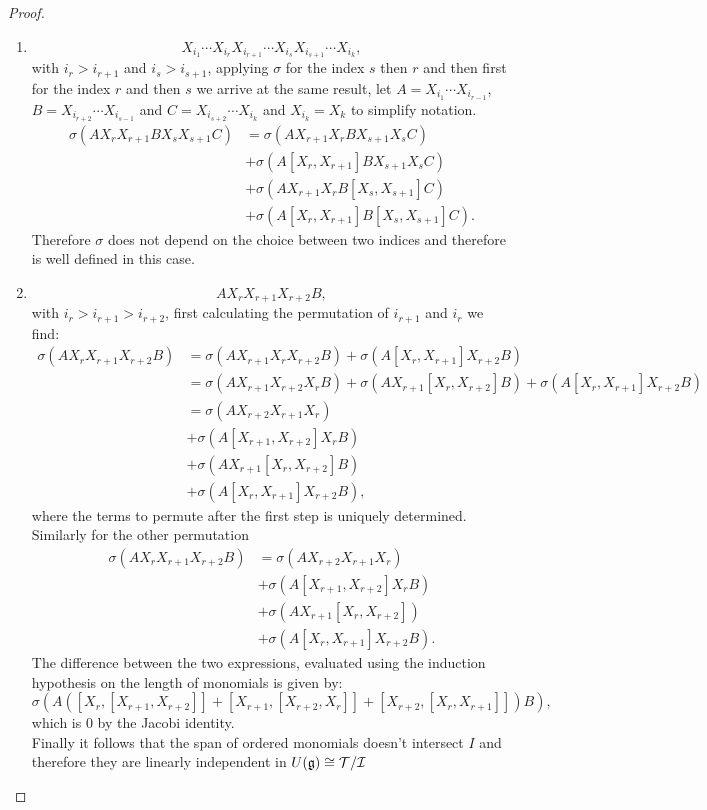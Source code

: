 \begin{proof}
\begin{enumerate}
		\item $$ 
		X_{i_1} \cdots X_{i_r}X_{i_{r+1}}\cdots X_{i_s}X_{i_{s+1}}\cdots X_{i_k},
		$$
		with $i_r>i_{r+1}$ and $i_s>i_{s+1}$, applying $\sigma$ for the index $s$ then $r$ and then first for the index $r$ and then $s$ we arrive at the same result, let $A=X_{i_1}\cdots X_{i_{r-1}}$, $B=X_{i_{r+2}}\cdots X_{i_{s-1}}$ and $C=X_{i_{s+2}}\cdots X_{i_k}$ and $X_{i_k}=X_k$ to simplify notation.
		\begin{align*}
		\sigma(AX_rX_{r+1}BX_sX_{s+1}C) &= \sigma(AX_{r+1}X_rBX_{s+1}X_sC) \\
		&+\sigma(A[X_r,X_{r+1}]BX_{s+1}X_sC)\\
		&+\sigma(AX_{r+1}X_rB[X_s,X_{s+1}]C)\\
		&+\sigma(A[X_r,X_{r+1}]B[X_s,X_{s+1}]C).
		\end{align*}
		Therefore $\sigma$ does not depend on the choice between two indices and therefore is well defined in this case.
		\item $$AX_rX_{r+1}X_{r+2}B,$$
		with $i_r > i_{r+1}>i_{r+2}$, first calculating the permutation of $i_{r+1}$ and $i_r$ we find:
		\begin{align*}
		\sigma (AX_rX_{r+1}X_{r+2}B) &= \sigma(AX_{r+1}X_rX_{r+2}B) + \sigma(A[X_r,X_{r+1}]X_{r+2}B)\\~
		&= \sigma(AX_{r+1}X_{r+2}X_rB) + \sigma(AX_{r+1}[X_r,X_{r+2}]B)+\sigma(A[X_{r},X_{r+1}]X_{r+2}B)\\
		&= \sigma(AX_{r+2}X_{r+1}X_r) \\
		&+ \sigma(A[X_{r+1},X_{r+2}]X_rB)\\
		&+ \sigma (AX_{r+1}[X_r,X_{r+2}]B)\\
		&+ \sigma(A[X_r,X_{r+1}]X_{r+2}B),
		\end{align*}
		where the terms to permute after the first step is uniquely determined. Similarly for the other permutation
		\begin{align*}
		\sigma(AX_rX_{r+1}X_{r+2}B) &= \sigma(AX_{r+2}X_{r+1}X_r) \\
		&+ \sigma(A[X_{r+1},X_{r+2}]X_rB)\\
		&+ \sigma(AX_{r+1}[X_r,X_{r+2}])\\
		&+\sigma(A[X_r,X_{r+1}]X_{r+2}B).
		\end{align*}
		The difference between the two expressions, evaluated using the induction hypothesis on the length of monomials is given by:
		$$\sigma(A([X_r,[X_{r+1},X_{r+2}]]+[X_{r+1},[X_{r+2},X_r]]+[X_{r+2},[X_r,X_{r+1}]])B),$$
		which is $0$ by the Jacobi identity.\\
		Finally it follows that the span of ordered monomials doesn't intersect $I$ and therefore they are linearly independent in $U(\mathfrak{g})\cong \mathcal{T}/\mathcal{I}$
		\end{enumerate}
\end{proof}\\

